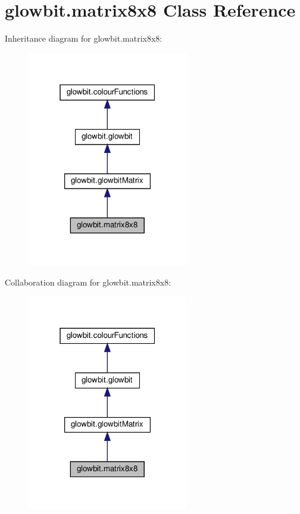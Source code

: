 \hypertarget{classglowbit_1_1matrix8x8}{}\section{glowbit.\+matrix8x8 Class Reference}
\label{classglowbit_1_1matrix8x8}


Inheritance diagram for glowbit.\+matrix8x8\+:\nopagebreak
\begin{figure}[H]
\begin{center}
\leavevmode
\includegraphics[width=199pt]{classglowbit_1_1matrix8x8__inherit__graph}
\end{center}
\end{figure}


Collaboration diagram for glowbit.\+matrix8x8\+:\nopagebreak
\begin{figure}[H]
\begin{center}
\leavevmode
\includegraphics[width=199pt]{classglowbit_1_1matrix8x8__coll__graph}
\end{center}
\end{figure}
